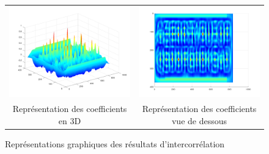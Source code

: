 \documentclass[a4paper,12pt,titlepage]{report}
\begin{document}
		\begin{figure}[h]
		\begin{center}
			\begin{tabular}{cc}
				\includegraphics[scale=0.19]{../illus/cor.png} & \includegraphics[scale=0.19]{../illus/cor1.png}\\
				Représentation des coefficients en 3D  & Représentation des coefficients vue de dessous\\
			\end{tabular}
		\end{center}
		\vspace{-1em}
		\caption{Représentations graphiques des résultats d'intercorrélation}
		\end{figure}
		
\end{document}
